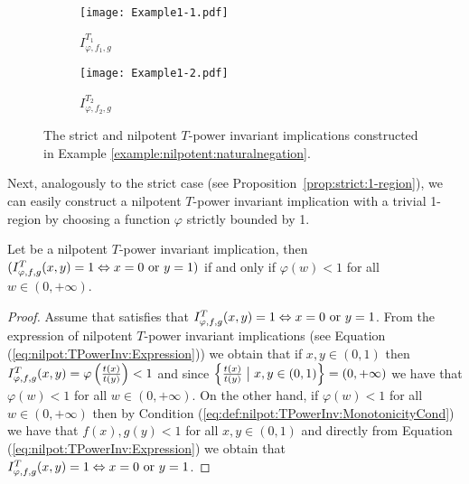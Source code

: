 \begin{example}
	\begin{figure}[H]
		\centering
		\begin{subfigure}{.5\textwidth}
			\centering
			\begin{center}
				\texttt{[image: Example1-1.pdf]}
			\end{center}
			\caption{$I_{\varphi,f_1,g}^{T_1}$~~~~~~~}
		\end{subfigure}%
		\begin{subfigure}{.5\textwidth}
			\centering
			\begin{center}
				\texttt{[image: Example1-2.pdf]}
			\end{center}
			\caption{$I_{\varphi,f_2,g}^{T_2}$~~~~~~~}
		\end{subfigure}
		\caption[Plot of a strict and a nilpotent $T$-power invariant implication.]{The strict and nilpotent $T$-power invariant implications constructed in Example \ref{example:nilpotent:naturalnegation}.}\label{exfig:nilpotent:naturalnegation}
	\end{figure}
\end{example}

Next, analogously to the strict case (see Proposition~\ref{prop:strict:1-region}), we can easily construct a nilpotent $T$-power invariant implication with a trivial 1-region by choosing a function $\varphi$ strictly bounded by 1.
\begin{proposition}\label{prop:nilpotent:1-region}
	Let \IT be a nilpotent $T$-power invariant implication, then $(I^T_{\varphi,f,g}(x,y)=1 \Leftrightarrow x=0 \text{ or } y=1)$ if and only if $\varphi(w)<1$ for all $w \in (0,+\infty)$.
\end{proposition}

\begin{proof}
	Assume that \IT satisfies that $I^T_{\varphi,f,g}(x,y)=1 \Leftrightarrow x=0 \text{ or } y=1$. From the expression of nilpotent $T$-power invariant implications (see Equation (\ref{eq:nilpot:TPowerInv:Expression})) we obtain that if $x,y\in (0,1)$ then $I^T_{\varphi,f,g}(x,y)=\varphi \left(\frac{t(x)}{t(y)}\right) <1$ and since $\left \{\frac{t(x)}{t(y)} \bigm| x,y \in (0,1) \right\} = (0,+\infty)$ we have that $\varphi(w)<1$ for all $w \in (0,+\infty)$. On the other hand, if $\varphi(w)<1$ for all $w \in (0,+\infty)$ then by Condition (\ref{eq:def:nilpot:TPowerInv:MonotonicityCond})  we have that $f(x),g(y)<1$ for all $x,y \in (0,1)$ and directly from Equation (\ref{eq:nilpot:TPowerInv:Expression}) we obtain that $I^T_{\varphi,f,g}(x,y)=1 \Leftrightarrow x=0 \text{ or } y=1$.
\end{proof}


